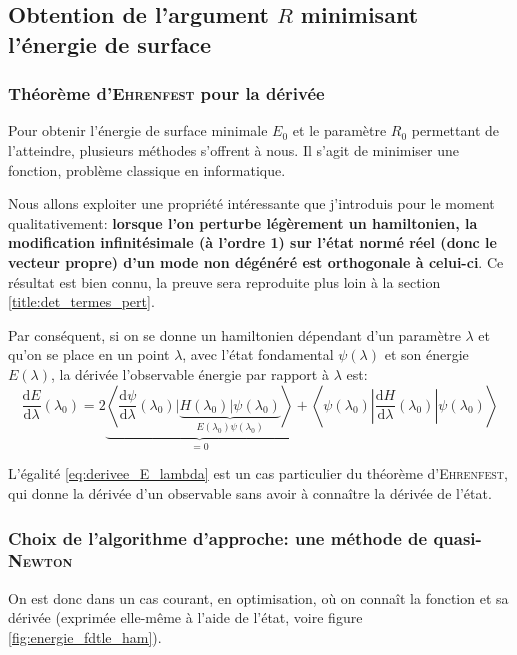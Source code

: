 \documentclass[svgnames,dvipsnames,a4paper,10pt,french]{report}
\begin{document}
\subsection{Obtention de l'argument $R$ minimisant l'énergie de surface}
\label{sec:minimum_R}

\subsubsection{Théorème d'\textsc{Ehrenfest} pour la dérivée}
Pour obtenir l'énergie de surface minimale $E_0$ et le paramètre $R_0$ permettant de l'atteindre, plusieurs méthodes s'offrent à nous. Il s'agit de minimiser une fonction, problème classique en informatique.

Nous allons exploiter une propriété intéressante que j'introduis pour le moment qualitativement: \textbf{lorsque l'on perturbe légèrement un hamiltonien, la modification infinitésimale (à l'ordre 1) sur l'état normé réel (donc le vecteur propre) d'un mode non dégénéré est orthogonale à celui-ci}. Ce résultat est bien connu, la preuve sera reproduite plus loin à la section \ref{title:det_termes_pert}.

Par conséquent, si on se donne un hamiltonien dépendant d'un paramètre $\lambda$ et qu'on se place en un point $\lambda$, avec l'état fondamental $\psi(\lambda)$ et son énergie $E(\lambda)$, la dérivée  l'observable énergie par rapport à  $\lambda$  est:
\begin{equation}
\label{eq:derivee_E_lambda}
    \frac{\mathrm{d}E}{\mathrm{d}\lambda}(\lambda_0) = 2\underbrace{ \left\langle \frac{\mathrm{d}\psi}{\mathrm{d}\lambda}(\lambda_0) | \underbrace{H(\lambda_0) | \psi(\lambda_0)  }_{E(\lambda_0)\psi(\lambda_0)} \right\rangle }_{=0} + \left\langle \psi(\lambda_0) \left| \frac{\mathrm{d}H}{\mathrm{d}\lambda}(\lambda_0) \right| \psi(\lambda_0) \right\rangle
\end{equation}

L'égalité \ref{eq:derivee_E_lambda} est un cas particulier du théorème d'\textsc{Ehrenfest}, qui donne la dérivée d'un observable sans avoir à connaître la dérivée de l'état.


\subsubsection{Choix de l'algorithme d'approche: une méthode de quasi-\textsc{Newton}}

On est donc dans un cas courant, en optimisation, où on connaît la fonction et sa dérivée (exprimée elle-même à l'aide de l'état, voire figure \ref{fig:energie_fdtle_ham}).
\end{document}
